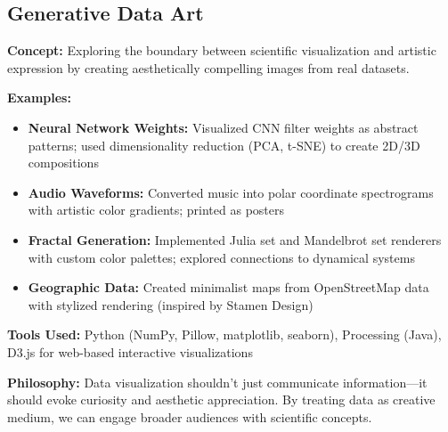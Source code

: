 \vspace{2em}


\subsection*{Generative Data Art}

\textbf{Concept:} Exploring the boundary between scientific visualization and artistic expression by creating aesthetically compelling images from real datasets.

\vspace{0.5em}

\textbf{Examples:}

\begin{itemize}[leftmargin=1.2em, itemsep=0.1em]
  \item \textbf{Neural Network Weights:} Visualized CNN filter weights as abstract patterns; used dimensionality reduction (PCA, t-SNE) to create 2D/3D compositions
  \item \textbf{Audio Waveforms:} Converted music into polar coordinate spectrograms with artistic color gradients; printed as posters
  \item \textbf{Fractal Generation:} Implemented Julia set and Mandelbrot set renderers with custom color palettes; explored connections to dynamical systems
  \item \textbf{Geographic Data:} Created minimalist maps from OpenStreetMap data with stylized rendering (inspired by Stamen Design)
\end{itemize}

\vspace{0.5em}

\textbf{Tools Used:} Python (NumPy, Pillow, matplotlib, seaborn), Processing (Java), D3.js for web-based interactive visualizations

\vspace{0.5em}

\textbf{Philosophy:} Data visualization shouldn't just communicate information—it should evoke curiosity and aesthetic appreciation. By treating data as creative medium, we can engage broader audiences with scientific concepts.

